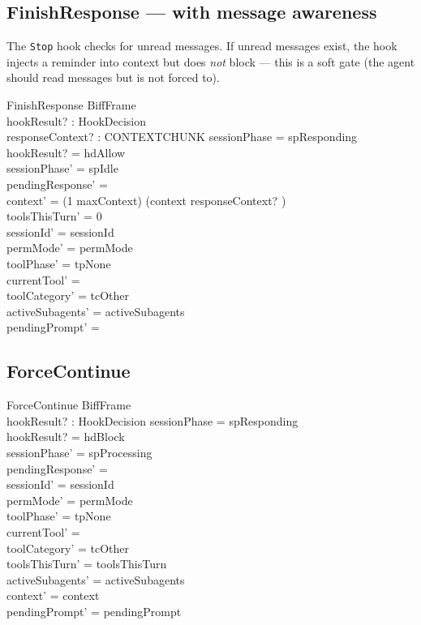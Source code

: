 \documentclass[a4paper,10pt,fleqn]{article}
\begin{document}
\subsection{FinishResponse --- with message awareness}

The \texttt{Stop} hook checks for unread messages. If unread
messages exist, the hook injects a reminder into context but
does \emph{not} block --- this is a soft gate (the agent should
read messages but is not forced to).

\begin{schema}{FinishResponse}
  BiffFrame \\
  hookResult? : HookDecision \\
  responseContext? : CONTEXTCHUNK
  \where
  sessionPhase = spResponding \\
  hookResult? = hdAllow \\
  sessionPhase' = spIdle \\
  pendingResponse' = \emptyset \\
  context' = (1 \upto maxContext) \dres (context \cat \langle responseContext? \rangle) \\
  toolsThisTurn' = 0 \\
  sessionId' = sessionId \\
  permMode' = permMode \\
  toolPhase' = tpNone \\
  currentTool' = \emptyset \\
  toolCategory' = tcOther \\
  activeSubagents' = activeSubagents \\
  pendingPrompt' = \emptyset
\end{schema}

\subsection{ForceContinue}

\begin{schema}{ForceContinue}
  BiffFrame \\
  hookResult? : HookDecision
  \where
  sessionPhase = spResponding \\
  hookResult? = hdBlock \\
  sessionPhase' = spProcessing \\
  pendingResponse' = \emptyset \\
  sessionId' = sessionId \\
  permMode' = permMode \\
  toolPhase' = tpNone \\
  currentTool' = \emptyset \\
  toolCategory' = tcOther \\
  toolsThisTurn' = toolsThisTurn \\
  activeSubagents' = activeSubagents \\
  context' = context \\
  pendingPrompt' = pendingPrompt
\end{schema}
\end{document}
